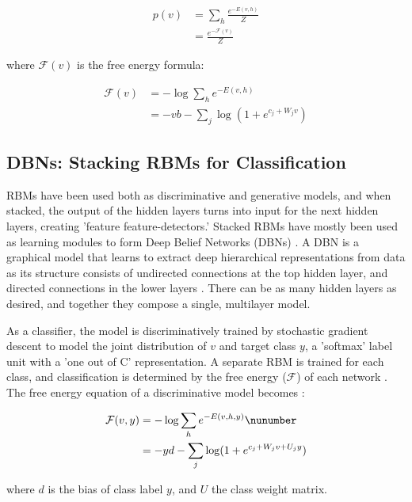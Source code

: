 \documentclass{report}
\begin{document}
\begin{align}
p(v) &=  \sum_h \frac{e^{-E(v,h)}}{Z} \nonumber \\
& = \frac{e^{-\mathcal{F}(v)}}{Z}
\end{align}

where $\mathcal{F}(v)$ is the free energy formula:

\begin{align}
\mathcal{F}(v) & = -\log \sum_h e^{-E(v,h)} \nonumber \\
& = -vb - \sum_j \log (1 + e^{c_j + W_j v})
\label{eq:fev}
\end{align}


\subsection{DBNs: Stacking RBMs for Classification}
RBMs have been used both as discriminative and generative models, and when stacked, the output of the hidden layers turns into input for the next hidden layers, creating 'feature feature-detectors.' Stacked RBMs have mostly been used as learning modules to form Deep Belief Networks (DBNs) \cite{Hinton} \cite{Schmah}. A DBN is a graphical model that learns to extract deep hierarchical representations from data as its structure consists of undirected connections at the top hidden layer, and directed connections in the lower layers \cite{Ngiam}. There can be as many hidden layers as desired, and together they compose a single, multilayer model.

As a classifier, the model is discriminatively trained by stochastic gradient descent to model the joint distribution of $v$ and target class $y$, a 'softmax' label unit with a 'one out of C' representation. A separate RBM is trained for each class, and classification is determined by the free energy ($\mathcal{F}$) of each network \cite{Elfwing}. The free energy equation of a discriminative model becomes \cite{Louradour}:

\begin{align}
\mathcal{F}(v, y) & = -\log \sum_h e^{-E(v,h,y)} \nunumber \\
& = -yd - \sum_j \log (1 + e^{c_j + W_j v + U_j y})
\label{eq:fevy}
\end{align}

where $d$ is the bias of class label $y$, and $U$ the class weight matrix. 
\end{document}
